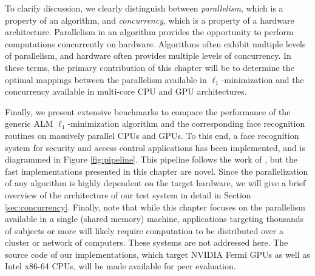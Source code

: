 To clarify discussion, we clearly distinguish between {\em parallelism},
which is a property of an algorithm, and {\em concurrency}, which is a
property of a hardware architecture. Parallelism in an algorithm provides the
opportunity to perform computations concurrently on hardware.  Algorithms often
exhibit multiple levels of parallelism, and hardware often provides multiple
levels of concurrency.  In these terms, the primary contribution of this chapter
will be to determine the optimal mappings between the parallelism available in
$\ell_1$-minimization and the concurrency available in multi-core CPU and GPU
architectures.

Finally, we present extensive benchmarks to compare the performance of the
generic ALM $\ell_1$-minimization algorithm and the corresponding face recognition
routines on massively parallel CPUs and GPUs.  To this end, a face
recognition system for security and access control applications has been implemented, 
and is diagrammed in Figure \ref{fig:pipeline}. This pipeline follows the work of \cite{WagnerA2011-PAMI}, but
the fast implementations presented in this chapter are novel.
Since the parallelization of any algorithm
is highly dependent on the target hardware, we will give a brief overview of
the architecture of our test system in detail in Section
\ref{sec:concurrency}.
Finally, note that 
while this chapter focuses on the parallelism available in a single (shared memory) machine,
applications targeting thousands of subjects or more will likely require computation to be
distributed over a cluster or network of computers. These systems are not addressed here.
The source code of our implementations, which target NVIDIA Fermi GPUs
as well as Intel x86-64 CPUs, will be made available for peer evaluation.
